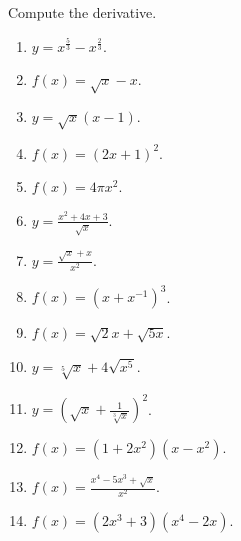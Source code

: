 Compute the derivative.
\begin{multicols}{2}
\begin{enumerate}[ref={\fcProblemRef}]
\item $\displaystyle y=x^{\frac53}-x^{\frac23}$.

\item $\displaystyle f(x)=\sqrt{x}-x$.

\item $\displaystyle y=\sqrt{x}(x-1)$.

\item $\displaystyle f(x)=(2x+1)^2$.

\item $\displaystyle f(x)=4\pi x^2$.

\item $\displaystyle y=\frac{ x^2+4x+3}{\sqrt{x}}$.

\item $\displaystyle y=\frac{\sqrt{x}+x}{x^2}$.

\item $\displaystyle f(x)=\left(x+x^{-1}\right)^3$.

\item $\displaystyle f(x)=\sqrt 2 x +\sqrt{5x}$.

\item $\displaystyle y=\sqrt[5]x+4\sqrt{x^5}$.

\item \label{problemd/dx((sqrt(x)+1/sqrt[3](x))^2)} $\displaystyle y=\left(\sqrt{x}+ \frac{1}{ \sqrt[3]{x}}\right)^2$.


\item $\displaystyle f(x)=(1+2x^2)(x-x^2)$.

\item $\displaystyle f(x)=\frac{x^4-5x^3+ \sqrt{x}}{x^2}$.

\item $\displaystyle f(x)=(2x^3+3)(x^4-2x)$.


\end{enumerate}
\end{multicols}
